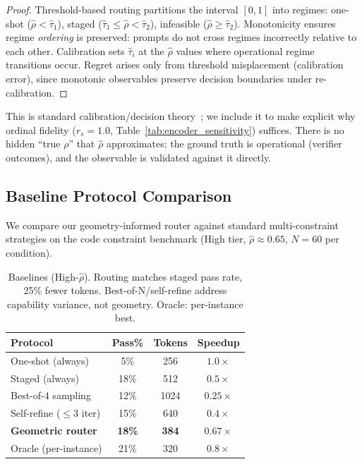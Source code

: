 \documentclass{article}
\theoremstyle{plain}
\theoremstyle{definition}
\theoremstyle{remark}
\newcommand{\rhohat}{\hat{\rho}}
\begin{document}
\begin{proof}
Threshold-based routing partitions the interval $[0,1]$ into regimes: one-shot ($\rhohat < \hat{\tau}_1$), staged ($\hat{\tau}_1 \leq \rhohat < \hat{\tau}_2$), infeasible ($\rhohat \geq \hat{\tau}_2$). Monotonicity ensures regime \emph{ordering} is preserved: prompts do not cross regimes incorrectly relative to each other. Calibration sets $\hat{\tau}_i$ at the $\rhohat$ values where operational regime transitions occur. Regret arises only from threshold misplacement (calibration error), since monotonic observables preserve decision boundaries under re-calibration.
\end{proof}

\noindent This is standard calibration/decision theory~\citep{degroot1983comparison}; we include it to make explicit why ordinal fidelity ($r_s = 1.0$, Table~\ref{tab:encoder_sensitivity}) suffices. There is no hidden ``true $\rho$'' that $\rhohat$ approximates; the ground truth is operational (verifier outcomes), and the observable is validated against it directly.

\subsection{Baseline Protocol Comparison}\label{app:baselines}

We compare our geometry-informed router against standard multi-constraint strategies on the code constraint benchmark (High tier, $\rhohat \approx 0.65$, $N=60$ per condition).

\begin{table}[ht]
\centering
\small
\caption{Baselines (High-$\rhohat$). Routing matches staged pass rate, 25\% fewer tokens. Best-of-N/self-refine address capability variance, not geometry. Oracle: per-instance best.}
\label{tab:baselines}
\begin{tabular}{lccc}
\toprule
Protocol & Pass\% & Tokens & Speedup \\
\midrule
One-shot (always) & 5\% & 256 & $1.0\times$ \\
Staged (always) & 18\% & 512 & $0.5\times$ \\
Best-of-4 sampling & 12\% & 1024 & $0.25\times$ \\
Self-refine ($\le$3 iter) & 15\% & 640 & $0.4\times$ \\
\textbf{Geometric router} & \textbf{18\%} & \textbf{384} & $\mathbf{0.67\times}$ \\
\midrule
Oracle (per-instance) & 21\% & 320 & $0.8\times$ \\
\bottomrule
\end{tabular}
\end{table}
\end{document}
